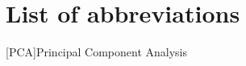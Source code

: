 \chapter*{List of abbreviations}



\begin{multicols}{2}

        \begin{acronym}
                [PCA]{Principal Component Analysis}
        \end{acronym}

\end{multicols}
